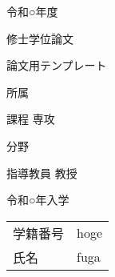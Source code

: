 \documentclass[main]{subfiles}
\begin{document}
\begin{titlepage}
    \centering

    {\Huge 令和○年度}
    \vspace{15truept}

    {\Huge 修士学位論文}
    \vspace*{60truept}

    {\Huge 論文用テンプレート}
    \vspace{60truept}

    {\Huge 所属}
    \vspace{15truept}

    {\Huge 課程 専攻}
    \vspace{15truept}

    {\Huge 分野}
    \vspace{60truept}

    {\Huge 指導教員 教授}
    \vspace{60truept}

    {\Huge 令和○年入学}
    \vspace{15truept}

    \Huge
    \begin{tabular}{ll}
        学籍番号 & hoge \\
        氏名   & fuga \\
    \end{tabular}

\end{titlepage}
\end{document}
